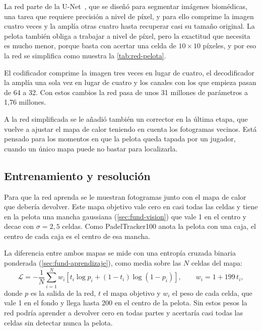 La red parte de la U-Net~\cite{ronneberger2015unet}, que se diseñó para segmentar imágenes biomédicas, una tarea que requiere precisión a nivel de píxel, y para ello comprime la imagen cuatro veces y la amplía otras cuatro hasta recuperar casi su tamaño original.
La pelota también obliga a trabajar a nivel de píxel, pero la exactitud que necesita es mucho menor, porque basta con acertar una celda de $10 \times 10$ píxeles, y por eso la red se simplifica como muestra la \cref{tab:red-pelota}.

El codificador comprime la imagen tres veces en lugar de cuatro, el decodificador la amplía una sola vez en lugar de cuatro y los canales con los que empieza pasan de 64 a 32.
Con estos cambios la red pasa de unos 31 millones de parámetros a 1,76 millones.

\begin{table}[htbp]
  \centering
  \caption{Diferencias entre la U-Net original y la red de detección de la pelota.}
  \label{tab:red-pelota}
  
\end{table}

A la red simplificada se le añadió también un corrector en la última etapa, que vuelve a ajustar el mapa de calor teniendo en cuenta los fotogramas vecinos.
Está pensado para los momentos en que la pelota queda tapada por un jugador, cuando un único mapa puede no bastar para localizarla.

\subsection{Entrenamiento y resolución}
\label{sec:entrenamiento-pelota}

Para que la red aprenda se le muestran fotogramas junto con el mapa de calor que debería devolver.
Este mapa objetivo vale cero en casi todas las celdas y tiene en la pelota una mancha gaussiana (\cref{sec:fund-vision}) que vale 1 en el centro y decae con $\sigma = 2{,}5$ celdas.
Como PadelTracker100 anota la pelota con una caja, el centro de cada caja es el centro de esa mancha.

La diferencia entre ambos mapas se mide con una entropía cruzada binaria ponderada (\cref{sec:fund-aprendizaje}), como media sobre las $N$ celdas del mapa:
\begin{equation}
  \mathcal{L} = -\frac{1}{N} \sum_{i=1}^{N} w_i \left[ t_i \log p_i + (1 - t_i) \log (1 - p_i) \right],
  \qquad w_i = 1 + 199\, t_i,
  \label{eq:perdida-pelota}
\end{equation}
donde $p$ es la salida de la red, $t$ el mapa objetivo y $w_i$ el peso de cada celda, que vale 1 en el fondo y llega hasta 200 en el centro de la pelota.
Sin estos pesos la red podría aprender a devolver cero en todas partes y acertaría casi todas las celdas sin detectar nunca la pelota.

